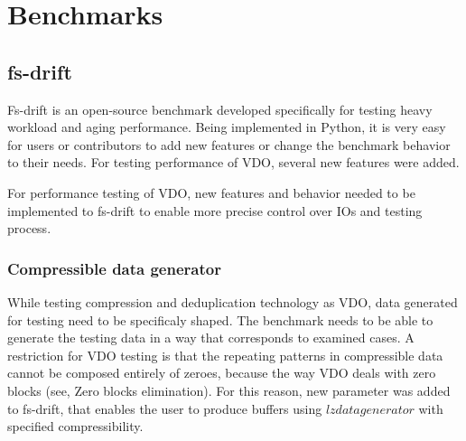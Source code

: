 \documentclass[
  color, %
  table, %
  lof,   %
  lot,   %
]{fithesis3}
\begin{document}


\chapter{Benchmarks}
\label{benchmarks}

\section{fs-drift}
Fs-drift is an open-source benchmark developed specifically for testing heavy workload and aging performance. Being implemented in Python, it is very easy for users or contributors to add new features or change the benchmark behavior to their needs. For testing performance of VDO, several new features were added.

For performance testing of VDO, new features and behavior needed to be implemented to fs-drift to enable more precise control over IOs and testing process.

\subsection{Compressible data generator}
While testing compression and deduplication technology as VDO, data generated for testing need to be specificaly shaped. The benchmark needs to be able to generate the testing data in a way that corresponds to examined cases. A restriction for VDO testing is that the repeating patterns in compressible data cannot be composed entirely of zeroes, because the way VDO deals with zero blocks (see, Zero blocks elimination). For this reason, new parameter was added to fs-drift, that enables the user to produce buffers using $lzdatagenerator$ with specified compressibility.
\end{document}
